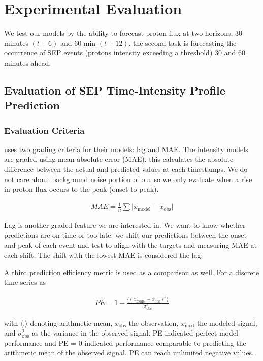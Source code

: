 \section{Experimental Evaluation}
\label{sec:experimentalevaluation}
We test our models by the ability to forecast proton flux at two horizons: 30 minutes $(t+6)$ and 60 min $(t+12)$. the second task is forecasting the occurrence of SEP events (protons intensity exceeding a threshold) 30 and 60 minutes ahead.

\subsection{Evaluation of SEP Time-Intensity Profile Prediction}
\subsubsection{Evaluation Criteria}
\cite{torres2025machine} uses two grading criteria for their models: lag and MAE.
The intensity models are graded using mean absolute error (MAE). this calculates the absolute difference between the actual and predicted values at each timestamps. We do not care about background noise portion of our so we only evaluate when a rise in proton flux occurs to the peak (onset to peak).

\begin{align}
    MAE = \frac{1}{n}\sum |x_{\text{model}}-x_{\text{obs}}|
\end{align}

Lag is another graded feature we are interested in. We want to know whether predictions are on time or too late. we shift our predictions between the onset and peak of each event and test to align with the targets and measuring MAE at each shift. The shift with the lowest MAE is considered the lag.

A third prediction efficiency metric is used as a comparison as well. For a discrete time series as

\begin{align}
  PE = 1 - \frac{\langle (x_{\text{model}} - x_{\text{obs}})^2\rangle}{\sigma^2_{\text{obs}}}  
\end{align}

with $\langle . \rangle$ denoting arithmetic mean, $x_{\text{obs}}$ the observation, $x_{\text{mod}}$ the modeled signal, and $\sigma_{\text{obs}}^2$ as the variance in the observed signal. PE indicated perfect model performance and PE = 0 indicated performance comparable to predicting the arithmetic mean of the observed signal. PE can reach unlimited negative values. \cite{Rastatter2011PE}

